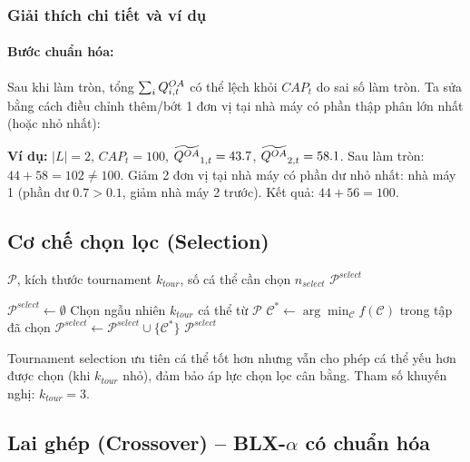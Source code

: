 \subsubsection*{Giải thích chi tiết và ví dụ}

\paragraph{Bước chuẩn hóa:} Sau khi làm tròn, tổng $\sum_i Q^{OA}_{i,t}$ có thể lệch khỏi $CAP_t$ do sai số làm tròn. Ta sửa bằng cách điều chỉnh thêm/bớt 1 đơn vị tại nhà máy có phần thập phân lớn nhất (hoặc nhỏ nhất):

\vspace{0.3em}
\noindent\textbf{Ví dụ:} $|L|=2$, $CAP_t = 100$, $\widetilde{Q^{OA}}_{1,t}=43.7$, $\widetilde{Q^{OA}}_{2,t}=58.1$. Sau làm tròn: $44+58=102 \neq 100$. Giảm 2 đơn vị tại nhà máy có phần dư nhỏ nhất: nhà máy 1 (phần dư $0.7 > 0.1$, giảm nhà máy 2 trước). Kết quả: $44 + 56 = 100$.

\subsection{Cơ chế chọn lọc (Selection)}

\begin{algorithm}[H]
\caption{Tournament Selection}
\label{alg:selection}
\begin{algorithmic}[1]
\Require $\mathcal{P}$, kích thước tournament $k_{tour}$, số cá thể cần chọn $n_{select}$
\Ensure $\mathcal{P}^{select}$

\State $\mathcal{P}^{select} \gets \emptyset$
  \State Chọn ngẫu nhiên $k_{tour}$ cá thể từ $\mathcal{P}$
  \State $\mathcal{C}^* \gets \arg\min_{\mathcal{C}} f(\mathcal{C})$ trong tập đã chọn
  \State $\mathcal{P}^{select} \gets \mathcal{P}^{select} \cup \{\mathcal{C}^*\}$
\EndWhile
\State \Return $\mathcal{P}^{select}$
\end{algorithmic}
\end{algorithm}

\noindent Tournament selection ưu tiên cá thể tốt hơn nhưng vẫn cho phép cá thể yếu hơn được chọn (khi $k_{tour}$ nhỏ), đảm bảo áp lực chọn lọc cân bằng. Tham số khuyến nghị: $k_{tour} = 3$.

\subsection{Lai ghép (Crossover) -- BLX-$\alpha$ có chuẩn hóa}

